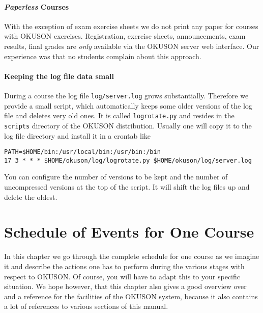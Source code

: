 \documentclass[12pt,openany,a4paper]{book}
\newcommand{\OKUSON}{\textsf{OKUSON}}
\begin{document}
\subsubsection*{\emph{Paperless} Courses}

With the exception of exam exercise sheets we do not print any paper for
courses with {\OKUSON} exercises. Registration, exercise sheets, 
announcements, exam results, final grades are \emph{only} available via the
{\OKUSON} server web interface. Our experience was that  no students complain
about this approach.

\subsubsection*{Keeping the log file data small}

During a course the log file \texttt{log/server.log} grows substantially.
Therefore we provide a small script, which automatically keeps some older
versions of the log file and deletes very old ones. It is called 
\texttt{logrotate.py} and resides in the \texttt{scripts} directory of
the {\OKUSON} distribution. Usually one will copy it to the log file 
directory and install it in a crontab like

{\small
\begin{verbatim}
PATH=$HOME/bin:/usr/local/bin:/usr/bin:/bin
17 3 * * * $HOME/okuson/log/logrotate.py $HOME/okuson/log/server.log
\end{verbatim}
}

You can configure the number of versions to be kept and the number of
uncompressed versions at the top of the script. It will shift the log 
files up and delete the oldest.


\chapter{Schedule of Events for One Course}\label{ch:semsched}

In this chapter we go through the complete schedule for one course as
we imagine it and describe the actions one has to perform during the various
stages with respect to {\OKUSON}. Of course, you will have to adapt this
to your specific situation. We hope however, that this chapter also gives
a good overview over and a reference for the facilities of the {\OKUSON}
system, because it also contains a lot of references to various sections
of this manual.
\end{document}
